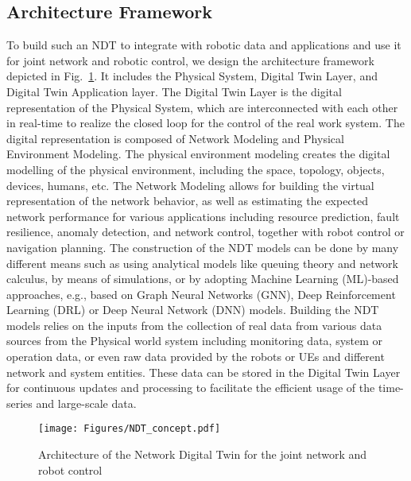 \subsection{Architecture Framework}
To build such an NDT to integrate with robotic data and applications and use it for joint network and robotic control, we design the architecture framework depicted in Fig.~\ref{fig:architecture}. It includes the Physical System, Digital Twin Layer, and Digital Twin Application layer. The Digital Twin Layer is the digital representation of the Physical System, which are interconnected with each other in real-time to realize the closed loop for the control of the real work system.  The digital representation is composed of Network Modeling and Physical Environment Modeling. The physical environment modeling creates the digital modelling of the physical environment, including the space, topology, objects, devices, humans, etc. 
The Network Modeling allows for building the virtual representation of the network behavior, as well as estimating the expected network performance for various applications including resource prediction, fault resilience, anomaly detection, and network control, together with robot control or navigation planning. 
The construction of the NDT models can be done by many different means such as using analytical models like queuing theory and network calculus, by means of simulations, or by adopting Machine Learning (ML)-based approaches, e.g., based on Graph Neural Networks (GNN), Deep Reinforcement Learning (DRL) or Deep Neural Network (DNN) models. Building the NDT models relies on the inputs from the collection of real data from various data sources from the Physical world system including monitoring data, system or operation data, or even raw data provided by the robots or UEs and different network and system entities. These data can be stored in the Digital Twin Layer for continuous updates and processing to facilitate the efficient usage of the time-series and large-scale data.  
 \vspace{2mm}
\begin{figure}[t]
\centering
\texttt{[image: Figures/NDT\_concept.pdf]}
\caption{Architecture of the Network Digital Twin for the joint network and robot control}
\label{fig:architecture}
 \vspace{-3mm}
\end{figure}
